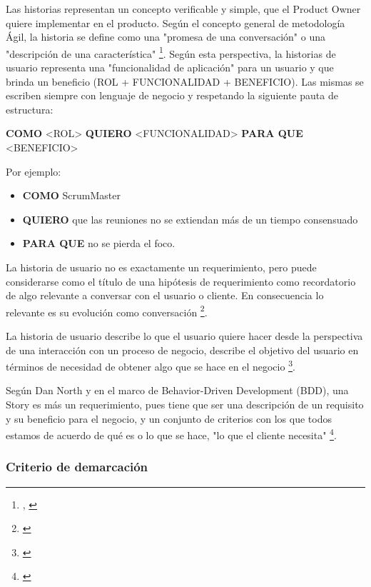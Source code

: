 Las historias representan un concepto verificable y simple, que el Product Owner quiere implementar en el producto. Según el concepto general de metodología Ágil, la historia se define como una "promesa de una conversación" o una "descripción de una característica" \footnote{\cite{UNTREF-2014}, \cite{Dan-North-2015}}. Según esta perspectiva, la historias de usuario representa una "funcionalidad de aplicación" para un usuario y que brinda un beneficio (ROL + FUNCIONALIDAD + BENEFICIO). Las mismas se escriben siempre con lenguaje de negocio y respetando la siguiente pauta de estructura:\newline

\textbf{COMO} <ROL> \textbf{QUIERO} <FUNCIONALIDAD> \textbf{PARA QUE} <BENEFICIO>\newline

Por ejemplo:

\begin{itemize}
\item \textbf{COMO} ScrumMaster 
\item \textbf{QUIERO} que las reuniones no se extiendan más de un tiempo consensuado 
\item \textbf{PARA QUE} no se pierda el foco.
\end{itemize}

La historia de usuario no es exactamente un requerimiento, pero puede considerarse como el título de una hipótesis de requerimiento como recordatorio de algo relevante a conversar con el usuario o cliente. En consecuencia lo relevante es su evolución como conversación \footnote{\cite{UNTREF-2014}}.

La historia de usuario describe lo que el usuario quiere hacer desde la perspectiva de una interacción con un proceso de negocio, describe el objetivo del usuario en términos de necesidad de obtener algo que se hace en el negocio \footnote{\cite{Scott-Bellware-2008}}.

Según Dan North y en el marco de Behavior-Driven Development (BDD), una Story es más un requerimiento, pues tiene que ser una descripción de un requisito y su beneficio para el negocio, y un conjunto de criterios con los que todos estamos de acuerdo de qué es o lo que se hace, "lo que el cliente necesita" \footnote{\cite{Dan-North-2015}}. 

\subsubsection{Criterio de demarcación}

